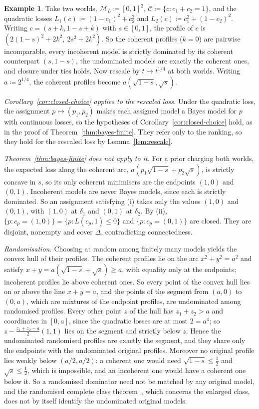 \documentclass[11pt]{article}
\theoremstyle{definition}
\newtheorem{example}[theorem]{Example}
\theoremstyle{remark}
\newcommand{\M}{\mathcal M}
\newcommand{\C}{\mathcal C}
\begin{document}
\begin{example}\label{ex:rescale}
Take two worlds, $\M_L\coloneqq[0,1]^2$, $\C\coloneqq\{c:c_1+c_2=1\}$, and the quadratic losses $L_1(c)\coloneqq(1-c_1)^2+c_2^2$ and $L_2(c)\coloneqq c_1^2+(1-c_2)^2$. Writing $c=(s+k,1-s+k)$ with $s\in[0,1]$, the profile of $c$ is $(2(1-s)^2+2k^2,\ 2s^2+2k^2)$. So the coherent profiles ($k=0$) are pairwise incomparable, every incoherent model is strictly dominated by its coherent counterpart $(s,1-s)$, the undominated models are exactly the coherent ones, and closure under ties holds. Now rescale by $t\mapsto t^{1/4}$ at both worlds. Writing $a\coloneqq2^{1/4}$, the coherent profiles become $a(\sqrt{1-s},\sqrt s)$.

\emph{Corollary~\ref{cor:closed-choice} applies to the rescaled loss.} Under the quadratic loss, the assignment $p\mapsto(p_1,p_2)$ makes each assigned model a Bayes model for $p$ with continuous losses, so the hypotheses of Corollary~\ref{cor:closed-choice} hold, as in the proof of Theorem~\ref{thm:bayes-finite}. They refer only to the ranking, so they hold for the rescaled loss by Lemma~\ref{lem:rescale}.

\emph{Theorem~\ref{thm:bayes-finite} does not apply to it.} For a prior charging both worlds, the expected loss along the coherent arc, $a(p_1\sqrt{1-s}+p_2\sqrt s)$, is strictly concave in $s$, so its only coherent minimisers are the endpoints $(1,0)$ and $(0,1)$. Incoherent models are never Bayes models, since each is strictly dominated. So an assignment satisfying (i) takes only the values $(1,0)$ and $(0,1)$, with $(1,0)$ at $\delta_1$ and $(0,1)$ at $\delta_2$. By (ii), $\{p:c_p=(1,0)\}=\{p:L(c_p,1)\le0\}$ and $\{p:c_p=(0,1)\}$ are closed. They are disjoint, nonempty and cover $\Delta$, contradicting connectedness.

\emph{Randomisation.} Choosing at random among finitely many models yields the convex hull of their profiles. The coherent profiles lie on the arc $x^2+y^2=a^2$ and satisfy $x+y=a(\sqrt{1-s}+\sqrt s)\ge a$, with equality only at the endpoints; incoherent profiles lie above coherent ones. So every point of the convex hull lies on or above the line $x+y=a$, and the points of the segment from $(a,0)$ to $(0,a)$, which are mixtures of the endpoint profiles, are undominated among randomised profiles. Every other point $z$ of the hull has $z_1+z_2>a$ and coordinates in $[0,a]$, since the quadratic losses are at most $2=a^4$; so $z-\frac{z_1+z_2-a}{2}(1,1)$ lies on the segment and strictly below $z$. Hence the undominated randomised profiles are exactly the segment, and they share only the endpoints with the undominated original profiles. Moreover no original profile lies weakly below $(a/2,a/2)$: a coherent one would need $\sqrt{1-s}\le\frac12$ and $\sqrt s\le\frac12$, which is impossible, and an incoherent one would have a coherent one below it. So a randomised dominator need not be matched by any original model, and the randomised complete class theorem~\cite[Theorem~1]{SSSK}, which concerns the enlarged class, does not by itself identify the undominated original models.
\end{example}
\end{document}
